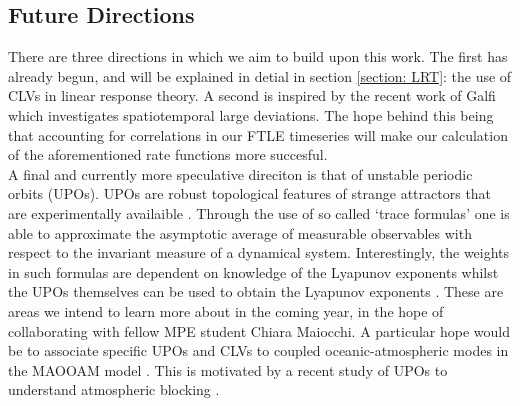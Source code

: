 \subsection{Future Directions} \label{subsection: Lyapunov future}

There are three directions in which we aim to build upon this work. The first has already begun, and will be explained in detial in section \ref{section: LRT}: the use of CLVs in linear response theory. A second is inspired by the recent work of Galfi \cite{Galfi2019} which investigates spatiotemporal large deviations. The hope behind this being that accounting for correlations in our FTLE timeseries will make our calculation of the aforementioned rate functions more succesful.\\

A final and  currently more speculative direciton is that of unstable periodic orbits (UPOs). UPOs are robust topological features of strange attractors that are experimentally availaible \cite{Cvitanovic1988}. Through the use of so called `trace formulas' one is able to approximate the asymptotic average of measurable observables with respect to the invariant measure of a dynamical system. Interestingly, the weights in such formulas are dependent on knowledge of the Lyapunov exponents whilst the UPOs themselves can be used to obtain the Lyapunov exponents \cite{Pikovsky2016} \cite{Cvitanovic}. These are areas we intend to learn more about in the coming year, in the hope of collaborating with fellow MPE student Chiara Maiocchi. A particular hope would be to associate specific UPOs and CLVs to coupled oceanic-atmospheric modes in the MAOOAM model \cite{DeCruz2016}. This is motivated by a recent study of UPOs to understand atmospheric blocking \cite{Lucarini2020}.
